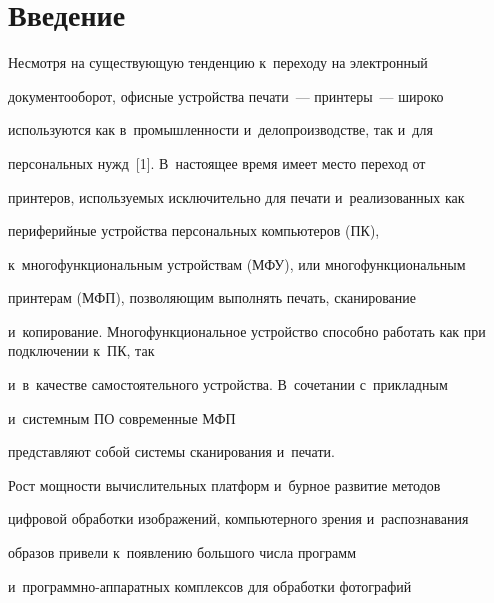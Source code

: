  \thispagestyle{headings}


 


 \vspace*{-18pt}





\section{Введение}





\vspace*{-5pt}





  Несмотря на существующую тенденцию к~переходу на электронный 


документооборот, офисные устройства печати~--- принтеры~--- широко 


используются как в~про\-мыш\-лен\-ности и~делопроизводстве, так и~для 


персональных нужд~[1]. В~на\-сто\-ящее время имеет мес\-то переход от 


принтеров, ис\-поль\-зу\-емых исключительно для печати и~реализованных как 


периферийные устройства персональных компьютеров (ПК), 


к~многофункциональным устройствам (МФУ), или многофункциональным 


принтерам (МФП), поз\-во\-ля\-ющим выполнять печать, сканирование 


и~копирование. Многофункциональное устройство способно работать как при подключении к~ПК, так 


и~в~качестве самостоятельного устройства. В~сочетании с~при\-клад\-ным 


и~сис\-тем\-ным ПО современные МФП 


пред\-став\-ля\-ют собой сис\-те\-мы сканирования и~пе\-чати. 


  


  Рост мощности вычислительных платформ и~бур\-ное развитие методов 


циф\-ро\-вой обработки изображений, компьютерного зрения и~распознавания 


образов привели к~появлению большого чис\-ла программ  


и~про\-грам\-мно-ап\-па\-рат\-ных комплексов для обработки фотографий 


